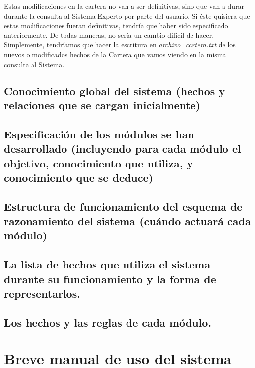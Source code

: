 \documentclass[12pt]{article}
\begin{document}
Estas modificaciones en la cartera no van a ser definitivas, sino que van a durar durante la consulta al Sistema Experto por parte del usuario. Si éste quisiera que estas modificaciones fueran definitivas, tendría que haber sido especificado anteriormente. De todas maneras, no sería un cambio difícil de hacer. Simplemente, tendríamos que hacer la escritura en \textit{archivo\_cartera.txt} de los nuevos o modificados hechos de la Cartera que vamos viendo en la misma consulta al Sistema. \\


\subsection{Conocimiento global del sistema (hechos y relaciones que se cargan
	inicialmente)}
\subsection{Especificación de los módulos se han desarrollado (incluyendo para cada
módulo el objetivo, conocimiento que utiliza, y conocimiento que se deduce)}
\subsection{Estructura de funcionamiento del esquema de razonamiento del sistema
(cuándo actuará cada módulo)}
\subsection{La lista de hechos que utiliza el sistema durante su funcionamiento y la forma
de representarlos.}
\subsection{Los hechos y las reglas de cada módulo.}



\newpage
\section{Breve manual de uso del sistema}
\end{document}
